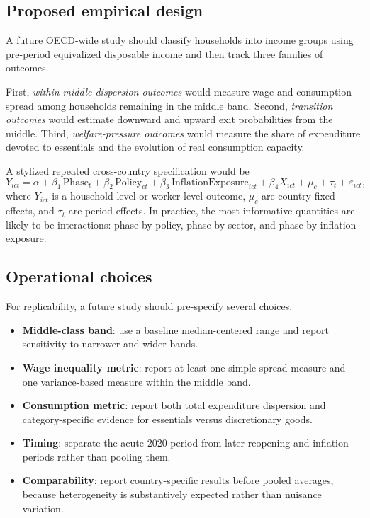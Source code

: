 \documentclass[11pt]{article}
\begin{document}
\subsection{Proposed empirical design}
A future OECD-wide study should classify households into income groups using pre-period equivalized disposable income and then track three families of outcomes.

First, \emph{within-middle dispersion outcomes} would measure wage and consumption spread among households remaining in the middle band. Second, \emph{transition outcomes} would estimate downward and upward exit probabilities from the middle. Third, \emph{welfare-pressure outcomes} would measure the share of expenditure devoted to essentials and the evolution of real consumption capacity.

A stylized repeated cross-country specification would be
\[
Y_{ict}=\alpha+\beta_1\,\text{Phase}_t+\beta_2\,\text{Policy}_{ct}+\beta_3\,\text{InflationExposure}_{ict}+\beta_4 X_{ict}+\mu_c+\tau_t+\varepsilon_{ict},
\]
where $Y_{ict}$ is a household-level or worker-level outcome, $\mu_c$ are country fixed effects, and $\tau_t$ are period effects. In practice, the most informative quantities are likely to be interactions: phase by policy, phase by sector, and phase by inflation exposure.

\subsection{Operational choices}
For replicability, a future study should pre-specify several choices.

\begin{itemize}
\item \textbf{Middle-class band}: use a baseline median-centered range and report sensitivity to narrower and wider bands.
\item \textbf{Wage inequality metric}: report at least one simple spread measure and one variance-based measure within the middle band.
\item \textbf{Consumption metric}: report both total expenditure dispersion and category-specific evidence for essentials versus discretionary goods.
\item \textbf{Timing}: separate the acute 2020 period from later reopening and inflation periods rather than pooling them.
\item \textbf{Comparability}: report country-specific results before pooled averages, because heterogeneity is substantively expected rather than nuisance variation.
\end{itemize}
\end{document}
